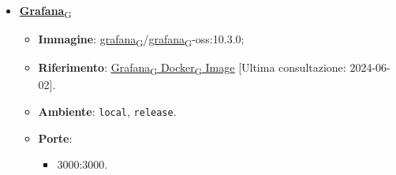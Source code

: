 \begin{itemize}
	\item \href{https://7last.github.io/docs/pb/documentazione-interna/glossario\#grafana}{\textbf{Grafana}\textsubscript{G}}
	      \begin{itemize}
		      \item \textbf{Immagine}: \href{https://7last.github.io/docs/pb/documentazione-interna/glossario\#grafana}{grafana\textsubscript{G}}/\href{https://7last.github.io/docs/pb/documentazione-interna/glossario\#grafana}{grafana\textsubscript{G}}-oss:10.3.0;
		      \item \textbf{Riferimento}: \underline{\href{https://hub.docker.com/r/grafana/grafana-oss}{\href{https://7last.github.io/docs/pb/documentazione-interna/glossario\#grafana}{Grafana\textsubscript{G}} \href{https://7last.github.io/docs/pb/documentazione-interna/glossario\#docker}{Docker\textsubscript{G}} Image}} [Ultima consultazione: 2024-06-02].
		      \item \textbf{Ambiente}: \texttt{local}, \texttt{release}.
		      \item \textbf{Porte}:
		            \begin{itemize}
			            \item 3000:3000.
		            \end{itemize}
	      \end{itemize}
\end{itemize}

